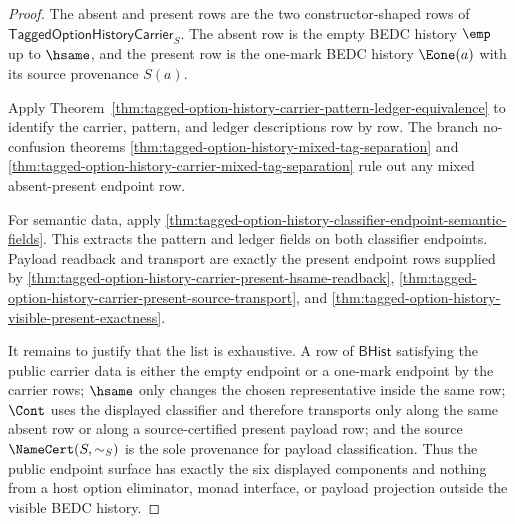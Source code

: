 \begin{proof}
The absent and present rows are the two constructor-shaped rows of
$\mathsf{TaggedOptionHistoryCarrier}_S$. The absent row is the empty BEDC
history $\emp$ up to $\hsame$, and the present row is the one-mark BEDC history
$\Eone(a)$ with its source provenance $S(a)$.

Apply
Theorem~\ref{thm:tagged-option-history-carrier-pattern-ledger-equivalence} to
identify the carrier, pattern, and ledger descriptions row by row. The branch
no-confusion theorems
\autoref{thm:tagged-option-history-mixed-tag-separation} and
\autoref{thm:tagged-option-history-carrier-mixed-tag-separation} rule out
any mixed absent-present endpoint row.

For semantic data, apply
\autoref{thm:tagged-option-history-classifier-endpoint-semantic-fields}. This
extracts the pattern and ledger fields on both classifier endpoints. Payload
readback and transport are exactly the present endpoint rows supplied by
\autoref{thm:tagged-option-history-carrier-present-hsame-readback},
\autoref{thm:tagged-option-history-carrier-present-source-transport}, and
\autoref{thm:tagged-option-history-visible-present-exactness}.

It remains to justify that the list is exhaustive. A row of
$\mathsf{BHist}$ satisfying the public carrier data is either the empty
endpoint or a one-mark endpoint by the carrier rows; $\hsame$ only changes the
chosen representative inside the same row; $\Cont$ uses the displayed
classifier and therefore transports only along the same absent row or along a
source-certified present payload row; and the source $\NameCert(S,\sim_S)$ is
the sole provenance for payload classification. Thus the public endpoint
surface has exactly the six displayed components and nothing from a host
option eliminator, monad interface, or payload projection outside the visible
BEDC history.
\end{proof}
